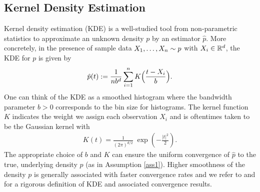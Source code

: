 
\subsection{Kernel Density Estimation} \label{sec:kde}
Kernel density estimation (KDE) is a well-studied tool from non-parametric statistics to approximate an unknown density $p$ by an estimator $\hat{p}$.
More concretely, in the presence of sample data $X_1, \dots, X_n \sim p$ with $X_i \in \mathbb{R}^d$, the KDE for $p$ is given by 
\begin{align*}
    \hat{p}(t) := \frac{1}{n b^d} \sum_{i=1}^n K\Big( \frac{t-X_i}{b}\Big).
\end{align*}
One can think of the KDE as a smoothed histogram where the bandwidth parameter $b >0$ corresponds to the bin size for histograms. The kernel function $K$ indicates the weight we assign each observation $X_i$ and is oftentimes taken to be the Gaussian kernel with
\begin{align*}
   K(t) = \frac{1}{(2 \pi)^{d/2}} \; \exp \left( -\frac{\vert t \vert^2}{2} \right).
\end{align*}
The appropriate choice of $b$ and $K$ can ensure the uniform convergence of $\hat p$ to the true, underlying density $p$ (as in Assumption \ref{ass1}). Higher smoothness of the density $p$ is generally associated with faster convergence rates and we refer to \cite{Jiang2017}  and \cite{Scott2015} for a rigorous definition of KDE and associated convergence results.

